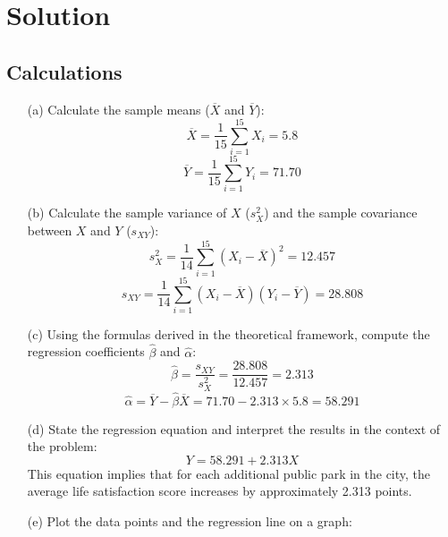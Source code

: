 \documentclass[11pt]{article}
\begin{document}
\section*{Solution}

\subsection*{Calculations}

\begin{itemize}
    \item[(a)] Calculate the sample means (\(\overline{X}\) and \(\overline{Y}\)):
    \[
    \overline{X} = \frac{1}{15} \sum_{i=1}^{15} X_i = 5.8
    \]
    \[
    \overline{Y} = \frac{1}{15} \sum_{i=1}^{15} Y_i = 71.70
    \]

    \item[(b)] Calculate the sample variance of \(X\) (\(s_X^2\)) and the sample covariance between \(X\) and \(Y\) (\(s_{XY}\)):
    \[
    s_X^2 = \frac{1}{14} \sum_{i=1}^{15} (X_i - \overline{X})^2 = 12.457
    \]
    \[
    s_{XY} = \frac{1}{14} \sum_{i=1}^{15} (X_i - \overline{X})(Y_i - \overline{Y}) = 28.808
    \]

    \item[(c)] Using the formulas derived in the theoretical framework, compute the regression coefficients \(\hat{\beta}\) and \(\hat{\alpha}\):
    \[
    \hat{\beta} = \frac{s_{XY}}{s_X^2} = \frac{28.808}{12.457} = 2.313
    \]
    \[
    \hat{\alpha} = \overline{Y} - \hat{\beta} \overline{X} = 71.70 - 2.313 \times 5.8 = 58.291
    \]

    \item[(d)] State the regression equation and interpret the results in the context of the problem:
    \[
    Y = 58.291 + 2.313X
    \]
    This equation implies that for each additional public park in the city, the average life satisfaction score increases by approximately 2.313 points.

    \item[(e)] Plot the data points and the regression line on a graph:

\begin{center}
\end{center}
\end{itemize}
\end{document}
